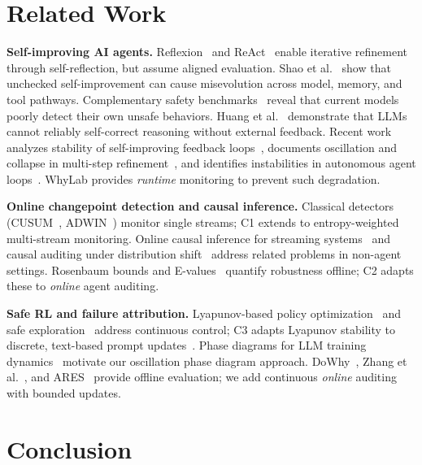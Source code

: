 \documentclass{article}
\begin{document}
\section{Related Work}
\label{sec:related}

\textbf{Self-improving AI agents.}
Reflexion~\cite{shinn2023reflexion} and ReAct~\cite{yao2023react}
enable iterative refinement through self-reflection, but assume
aligned evaluation. Shao et al.~\cite{misevolution2025} show that
unchecked self-improvement can cause misevolution across model,
memory, and tool pathways. Complementary safety
benchmarks~\cite{rjudge2024,agentharm2025} reveal that current models
poorly detect their own unsafe behaviors. Huang et al.~\cite{huang2024selfcorrect} demonstrate that LLMs cannot reliably self-correct reasoning without external feedback. Recent work analyzes stability of self-improving feedback loops~\cite{pan2025selfimprovement}, documents oscillation and collapse in multi-step refinement~\cite{guo2025oscillation}, and identifies instabilities in autonomous agent loops~\cite{kumar2025agentsafety}. WhyLab provides \emph{runtime} monitoring to prevent such degradation.

\textbf{Online changepoint detection and causal inference.}
Classical detectors (CUSUM~\cite{page1954cusum},
ADWIN~\cite{bifet2007adwin}) monitor single streams;
C1 extends to entropy-weighted multi-stream monitoring.
Online causal inference for streaming systems~\cite{zhang2025onlinecausal} and causal auditing under distribution shift~\cite{chen2026causalaudit} address related problems in non-agent settings.
Rosenbaum bounds and E-values~\cite{vanderweele2017} quantify robustness offline; C2 adapts these to \emph{online} agent auditing.

\textbf{Safe RL and failure attribution.}
Lyapunov-based policy optimization~\cite{chow2018lyapunov} and
safe exploration~\cite{berkenkamp2017safe} address continuous control;
C3 adapts Lyapunov stability to discrete, text-based prompt updates~\cite{lee2025lyapunov_llm}. Phase diagrams for LLM training dynamics~\cite{tian2025phasediagram} motivate our oscillation phase diagram approach.
DoWhy~\cite{dowhy2020}, Zhang et al.~\cite{zhang2025whowhen},
and ARES~\cite{saadfalcon2024ares} provide offline evaluation;
we add continuous \emph{online} auditing with bounded updates.


\section{Conclusion}
\label{sec:conclusion}
\end{document}

